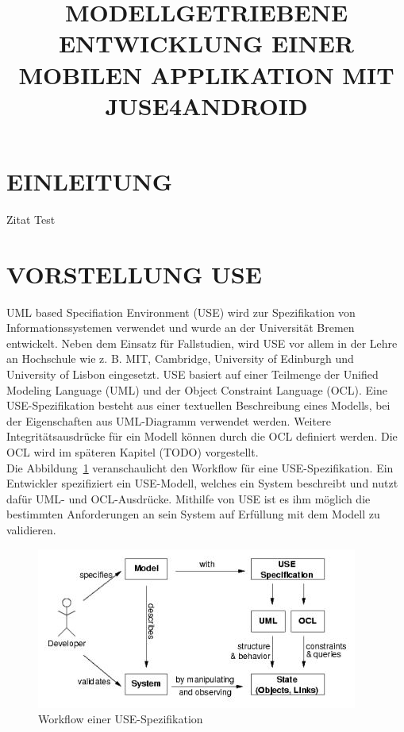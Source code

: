 \documentclass[a4paper,twoside]{article}
\begin{document}
\title{\uppercase{Modellgetriebene Entwicklung einer mobilen Applikation mit JUSE4Android}}

\author{
}




\onecolumn \maketitle \normalsize \vfill

\section{\uppercase{Einleitung}}
\label{sec:introduction}
\noindent Zitat Test
\cite{SilvaMasterThesis}

\section{\uppercase{Vorstellung USE}}

UML based Specifiation Environment (USE) wird zur Spezifikation von Informationssystemen verwendet und wurde an der Universität Bremen entwickelt. Neben dem Einsatz für Fallstudien, wird USE vor allem in der Lehre an Hochschule wie z. B. MIT, Cambridge, University of Edinburgh und University of Lisbon eingesetzt.  USE basiert auf einer Teilmenge der Unified Modeling Language (UML) und der Object Constraint Language (OCL). Eine USE-Spezifikation besteht aus einer textuellen Beschreibung eines Modells, bei der Eigenschaften aus UML-Diagramm verwendet werden. Weitere Integritätsausdrücke für ein Modell können durch die OCL definiert werden. \cite{Use07} Die OCL wird im späteren Kapitel (TODO) vorgestellt. 
\\

Die Abbildung~\ref{fig:Grafik1} veranschaulicht den Workflow für eine USE-Spezifikation. Ein Entwickler spezifiziert ein USE-Modell, welches ein System beschreibt und nutzt dafür UML- und OCL-Ausdrücke. Mithilfe von USE ist es ihm möglich die bestimmten Anforderungen an sein System auf Erfüllung mit dem Modell zu validieren.

\begin{figure}[!h]
	\includegraphics[scale=.7]{pics/USE_workflow.jpg}
	\caption{Workflow einer USE-Spezifikation \cite{Data07}}
	\label{fig:Grafik1}
\end{figure}
\end{document}
